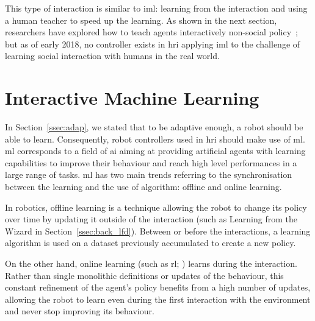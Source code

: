  This type of interaction is similar to \acrfull{iml}: learning from the interaction and using a human teacher to speed up the learning. As shown in the next section, researchers have explored how to teach agents interactively non-social policy~\citep{scheutz2017spoken,cakmak2010designing}; but as of early 2018, no controller exists in \gls{hri} applying \gls{iml} to the challenge of learning social interaction with humans in the real world.
  
\section{Interactive Machine Learning} \label{sec:back_iml}

In Section~\ref{ssec:adap}, we stated that to be adaptive enough, a robot should be able to learn. Consequently, robot controllers used in \gls{hri} should make use of \acrfull{ml}. 
\gls{ml} corresponds to a field of \gls{ai} aiming at providing artificial agents with learning capabilities to improve their behaviour and reach high level performances in a large range of tasks. \gls{ml} has two main trends referring to the synchronisation between the learning and the use of algorithm: offline and online learning.

In robotics, offline learning is a technique allowing the robot to change its policy over time by updating it outside of the interaction (such as Learning from the Wizard in Section~\ref{ssec:back_lfd}). Between or before the interactions, a learning algorithm is used on a dataset previously accumulated to create a new policy.

On the other hand, online learning (such as \gls{rl}; \citealt{sutton1998reinforcement}) learns during the interaction. Rather than single monolithic definitions or updates of the behaviour, this constant refinement of the agent's policy benefits from a high number of updates, allowing the robot to learn even during the first interaction with the environment and never stop improving its behaviour.

